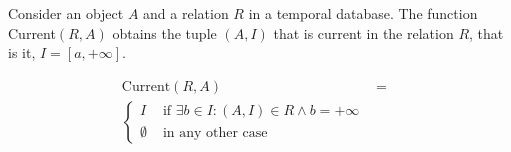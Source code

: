 
\begin{definition}
\label{def:current-in-relation}
Consider an object $A$ and a relation $R$ in a temporal database. The function Current$\left(R, A \right)$ obtains the tuple $\left(A, I \right)$ that is current in the relation $R$, that is it, $I = \left[a, +\infty \right]$.

\begin{align}
\label{eq:current-in-relation}
\mbox{Current} \left(R, A \right) &=& \\ 
\begin{cases}
\nonumber
I & \mbox{ if } \exists b \in I : (A,I) \in R \wedge b = +\infty \\
\emptyset & \mbox{ in any other case }
\end{cases}
\end{align}
\end{definition}


%



